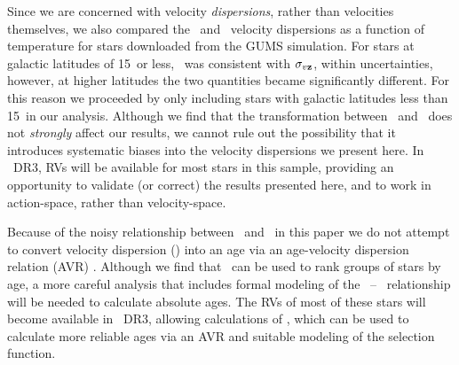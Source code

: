 Since we are concerned with velocity {\it dispersions}, rather than velocities
themselves, we also compared the \vb\ and \vz\ velocity dispersions as a
function of temperature for
stars downloaded from the GUMS simulation.
For stars at galactic latitudes of 15\degrees\ or less, \sigmavb\ was
consistent with $\sigma_{v{\bf z}}$, within uncertainties, however, at higher
latitudes the two quantities became significantly different.
For this reason we proceeded by only including stars with galactic latitudes
less than 15\degrees\ in our analysis.
Although we find that the transformation between \vz\ and \vb\ does not {\it
strongly} affect our results, we cannot rule out the possibility that it
introduces systematic biases into the velocity dispersions we present here.
In \gaia\ DR3, RVs will be available for most stars in this sample, providing
an opportunity to validate (or correct) the results presented here, and to
work in action-space, rather than velocity-space.



Because of the noisy relationship between \vb\ and \vz\, in this paper we do
not attempt to convert velocity dispersion (\sigmavb) into an age via an
age-velocity dispersion relation (AVR) \citep[\eg][]{holmberg2009}.
Although we find that \sigmavb\ can be used to rank groups of stars by age, a
more careful analysis that includes formal modeling of the \vb\ -- \vz\
relationship will be needed to calculate absolute ages.
The RVs of most of these stars will become available in \Gaia\ DR3, allowing
calculations of \vz, which can be used to calculate more reliable ages via an
AVR and suitable modeling of the selection function.

